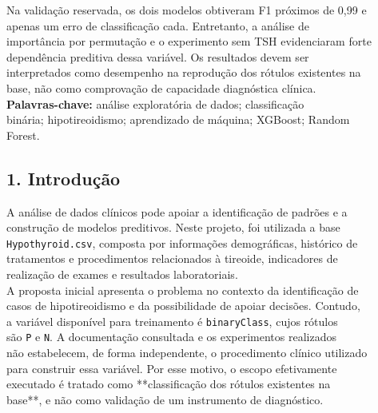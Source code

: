 \documentclass{article}
\begin{document}
Na validação reservada, os dois modelos obtiveram F1 próximos de 0,99 e \\
apenas um erro de classificação cada. Entretanto, a análise de \\
importância por permutação e o experimento sem TSH evidenciaram forte \\
dependência preditiva dessa variável. Os resultados devem ser \\
interpretados como desempenho na reprodução dos rótulos existentes na \\
base, não como comprovação de capacidade diagnóstica clínica. \\

\textbf{Palavras-chave:} análise exploratória de dados; classificação \\
binária; hipotireoidismo; aprendizado de máquina; XGBoost; Random \\
Forest. \\

\subsection{1. Introdução}

A análise de dados clínicos pode apoiar a identificação de padrões e a \\
construção de modelos preditivos. Neste projeto, foi utilizada a base \\
\texttt{Hypothyroid.csv}, composta por informações demográficas, histórico de \\
tratamentos e procedimentos relacionados à tireoide, indicadores de \\
realização de exames e resultados laboratoriais. \\

A proposta inicial apresenta o problema no contexto da identificação de \\
casos de hipotireoidismo e da possibilidade de apoiar decisões. Contudo, \\
a variável disponível para treinamento é \texttt{binaryClass}, cujos rótulos \\
são \texttt{P} e \texttt{N}. A documentação consultada e os experimentos realizados \\
não estabelecem, de forma independente, o procedimento clínico utilizado \\
para construir essa variável. Por esse motivo, o escopo efetivamente \\
executado é tratado como **classificação dos rótulos existentes na \\
base**, e não como validação de um instrumento de diagnóstico. \\
\end{document}
